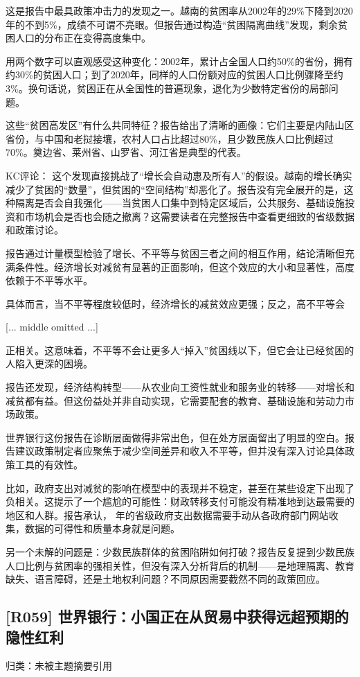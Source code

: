 \documentclass[11pt]{ctexart}
\begin{document}
这是报告中最具政策冲击力的发现之一。越南的贫困率从2002年的29\%下降到2020年的不到5\%，成绩不可谓不亮眼。但报告通过构造“贫困隔离曲线”发现，剩余贫困人口的分布正在变得高度集中。

用两个数字可以直观感受这种变化：2002年，累计占全国人口约50\%的省份，拥有约30\%的贫困人口；到了2020年，同样的人口份额对应的贫困人口比例骤降至约3\%。换句话说，贫困正在从全国性的普遍现象，退化为少数特定省份的局部问题。

这些“贫困高发区”有什么共同特征？报告给出了清晰的画像：它们主要是内陆山区省份，与中国和老挝接壤，农村人口占比超过80\%，且少数民族人口比例超过70\%。奠边省、莱州省、山罗省、河江省是典型的代表。

KC评论： 这个发现直接挑战了“增长会自动惠及所有人”的假设。越南的增长确实减少了贫困的“数量”，但贫困的“空间结构”却恶化了。报告没有完全展开的是，这种隔离是否会自我强化——当贫困人口集中到特定区域后，公共服务、基础设施投资和市场机会是否也会随之撤离？这需要读者在完整报告中查看更细致的省级数据和政策讨论。

报告通过计量模型检验了增长、不平等与贫困三者之间的相互作用，结论清晰但充满条件性。经济增长对减贫有显著的正面影响，但这个效应的大小和显著性，高度依赖于不平等水平。

具体而言，当不平等程度较低时，经济增长的减贫效应更强；反之，高不平等会

[... middle omitted ...]

正相关。这意味着，不平等不会让更多人“掉入”贫困线以下，但它会让已经贫困的人陷入更深的困境。

报告还发现，经济结构转型——从农业向工资性就业和服务业的转移——对增长和减贫都有益。但这份益处并非自动实现，它需要配套的教育、基础设施和劳动力市场政策。

世界银行这份报告在诊断层面做得非常出色，但在处方层面留出了明显的空白。报告建议政策制定者应聚焦于减少空间差异和收入不平等，但并没有深入讨论具体政策工具的有效性。

比如，政府支出对减贫的影响在模型中的表现并不稳定，甚至在某些设定下出现了负相关。这提示了一个尴尬的可能性：财政转移支付可能没有精准地到达最需要的地区和人群。报告承认， 年的省级政府支出数据需要手动从各政府部门网站收集，数据的可得性和质量本身就是问题。

另一个未解的问题是：少数民族群体的贫困陷阱如何打破？报告反复提到少数民族人口比例与贫困率的强相关性，但没有深入分析背后的机制——是地理隔离、教育缺失、语言障碍，还是土地权利问题？不同原因需要截然不同的政策回应。

\subsection{[R059] 世界银行：小国正在从贸易中获得远超预期的隐性红利}
{\small\color{refgray}归类：未被主题摘要引用}
\end{document}
